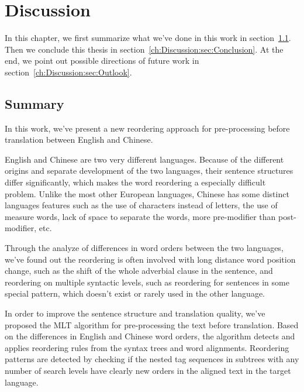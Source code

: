 

\chapter{Discussion}
\label{ch:Discussion}

In this chapter, we first summarize what we've done in this work in section~\ref{ch:Discussion:sec:Summary}. Then we conclude this thesis in section~\ref{ch:Discussion:sec:Conclusion}. At the end, we point out possible directions of future work in section~\ref{ch:Discussion:sec:Outlook}.

\section{Summary}
\label{ch:Discussion:sec:Summary}

In this work, we've present a new reordering approach for pre-processing before translation between English and Chinese.

English and Chinese are two very different languages. Because of the different origins and separate development of the two languages, their sentence structures differ significantly, which makes the word reordering a especially difficult problem. Unlike the most other European languages, Chinese has some distinct languages features such as the use of characters instead of letters, the use of measure words, lack of space to separate the words, more pre-modifier than post-modifier, etc.

Through the analyze of differences in word orders between the two languages, we've found out the reordering is often involved with long distance word position change, such as the shift of the whole adverbial clause in the sentence, and reordering on multiple syntactic levels, such as reordering for sentences in some special pattern, which doesn't exist or rarely used in the other language.

In order to improve the sentence structure and translation quality, we've proposed the \acf{MLT} algorithm for pre-processing the text before translation. Based on the differences in English and Chinese word orders, the algorithm detects and applies reordering rules from the syntax trees and word alignments. Reordering patterns are detected by checking if the nested tag sequences in subtrees with any number of search levels have clearly new orders in the aligned text in the target language.

